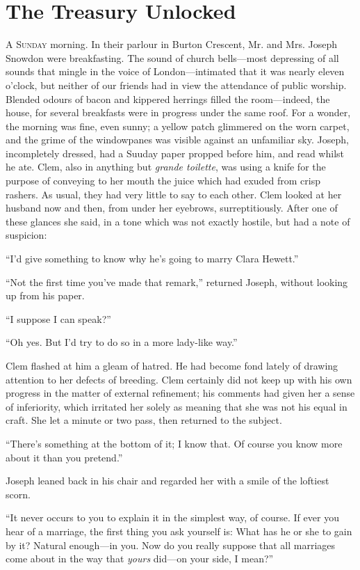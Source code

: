 \chapter{The Treasury Unlocked}

\textsc{A Sunday} morning. In their parlour in Burton Crescent, Mr. and
Mrs. Joseph Snowdon were breakfasting. The sound of church bells---most
depressing of all sounds that mingle in the voice of London---intimated
that it was nearly eleven o'clock, but neither of our friends had in
view the attendance of public worship. Blended odours of bacon and
kippered herrings filled the room---indeed, the house, for several
breakfasts were in progress under the same roof. For a wonder, the
morning was fine, even sunny; a yellow patch glimmered on the worn
carpet, and the grime of the windowpanes was visible against an
unfamiliar sky. Joseph, incompletely dressed, had a Suuday paper propped
before him, and read whilst he ate. Clem, also in anything but
\emph{grande toilette}, was using a knife for the purpose of {}conveying
to her mouth the juice which had exuded from crisp rashers. As usual,
they had very little to say to each other. Clem looked at her husband
now and then, from under her eyebrows, surreptitiously. After one of
these glances she said, in a tone which was not exactly hostile, but had
a note of suspicion:

``I'd give something to know why he's going to marry Clara Hewett.''

``Not the first time you've made that remark,'' returned Joseph, without
looking up from his paper.

``I suppose I can speak?''

``Oh yes. But I'd try to do so in a more lady-like way.''

Clem flashed at him a gleam of hatred. He had become fond lately of
drawing attention to her defects of breeding. Clem certainly did not
keep up with his own progress in the matter of external refinement; his
comments had given her a sense of inferiority, which irritated her
solely as meaning that she was not his equal in craft. She let a minute
or two pass, then returned to the subject.

``There's something at the bottom of it; I {}know that. Of course you
know more about it than you pretend.''

Joseph leaned back in his chair and regarded her with a smile of the
loftiest scorn.

``It never occurs to you to explain it in the simplest way, of course.
If ever you hear of a marriage, the first thing you ask yourself is:
What has he or she to gain by it? Natural enough---in you. Now do you
really suppose that all marriages come about in the way that
\emph{yours} did---on your side, I mean?''

